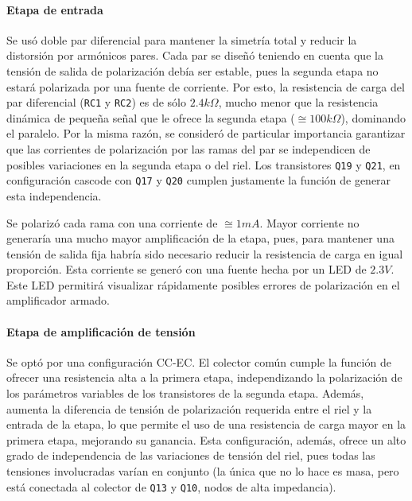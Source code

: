 \documentclass[a4paper,12pt,twoside]{article}
\begin{document}
\paragraph{Etapa de entrada}

Se usó doble par diferencial para mantener la simetría total y reducir la distorsión por armónicos pares. Cada par se diseñó teniendo en cuenta que la tensión de salida de polarización debía ser estable, pues la segunda etapa no estará polarizada por una fuente de corriente. Por esto, la resistencia de carga del par diferencial (\texttt{RC1} y \texttt{RC2}) es de sólo $2.4k\Omega$, mucho menor que la resistencia dinámica de pequeña señal que le ofrece la segunda etapa ($\cong 100k\Omega$), dominando el paralelo.
Por la misma razón, se consideró de particular importancia garantizar que las corrientes de polarización por las ramas del par se independicen de posibles variaciones en la segunda etapa o del riel. Los transistores \texttt{Q19} y \texttt{Q21}, en configuración cascode con \texttt{Q17} y \texttt{Q20} cumplen justamente la función de generar esta independencia.

Se polarizó cada rama con una corriente de $\cong 1mA$. Mayor corriente no generaría una mucho mayor amplificación de la etapa, pues, para mantener una tensión de salida fija habría sido necesario reducir la resistencia de carga en igual proporción. Esta corriente se generó con una fuente hecha por un LED de $2.3V$. Este LED permitirá visualizar rápidamente posibles errores de polarización en el amplificador armado.


\paragraph{Etapa de amplificación de tensión}

Se optó por una configuración CC-EC. El colector común cumple la función de ofrecer una resistencia alta a la primera etapa, independizando la polarización de los parámetros variables de los transistores de la segunda etapa. Además, aumenta la diferencia de tensión de polarización requerida entre el riel y la entrada de la etapa, lo que permite el uso de una resistencia de carga mayor en la primera etapa, mejorando su ganancia. Esta configuración, además, ofrece un alto grado de independencia de las variaciones de tensión del riel, pues todas las tensiones involucradas varían en conjunto (la única que no lo hace es masa, pero está conectada al colector de \texttt{Q13} y \texttt{Q10}, nodos de alta impedancia). 
\end{document}
